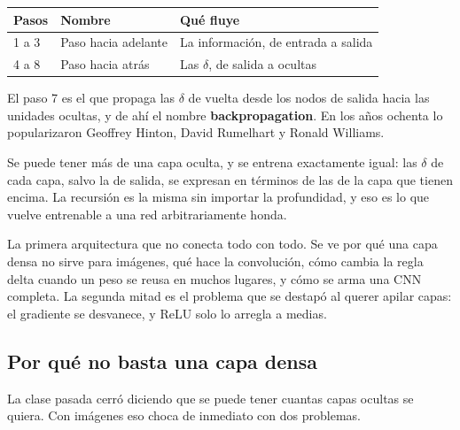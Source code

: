 \documentclass[11pt,letterpaper]{article}
\begin{document}
\begin{center}
\begin{tabular}{lll}
  \toprule
  \textbf{Pasos} & \textbf{Nombre} & \textbf{Qué fluye} \\
  \midrule
  1 a 3 & Paso hacia adelante & La información, de entrada a salida \\
  4 a 8 & Paso hacia atrás    & Las $\delta$, de salida a ocultas \\
  \bottomrule
\end{tabular}
\end{center}

El paso 7 es el que propaga las $\delta$ de vuelta desde los nodos de
salida hacia las unidades ocultas, y de ahí el nombre
\textbf{backpropagation}. En los años ochenta lo popularizaron
Geoffrey Hinton, David Rumelhart y Ronald Williams.

\begin{idea}
  Se puede tener más de una capa oculta, y se entrena exactamente
  igual: las $\delta$ de cada capa, salvo la de salida, se expresan
  en términos de las de la capa que tienen encima. La recursión es la
  misma sin importar la profundidad, y eso es lo que vuelve
  entrenable a una red arbitrariamente honda.
\end{idea}



\newpage



\begin{quick_sum}
    La primera arquitectura que no conecta todo con todo. Se ve por
    qué una capa densa no sirve para imágenes, qué hace la
    convolución, cómo cambia la regla delta cuando un peso se reusa en
    muchos lugares, y cómo se arma una CNN completa. La segunda mitad
    es el problema que se destapó al querer apilar capas: el gradiente
    se desvanece, y ReLU solo lo arregla a medias.
\end{quick_sum}

\subsection*{Por qué no basta una capa densa}

La clase pasada cerró diciendo que se puede tener cuantas capas
ocultas se quiera. Con imágenes eso choca de inmediato con dos
problemas.
\end{document}
